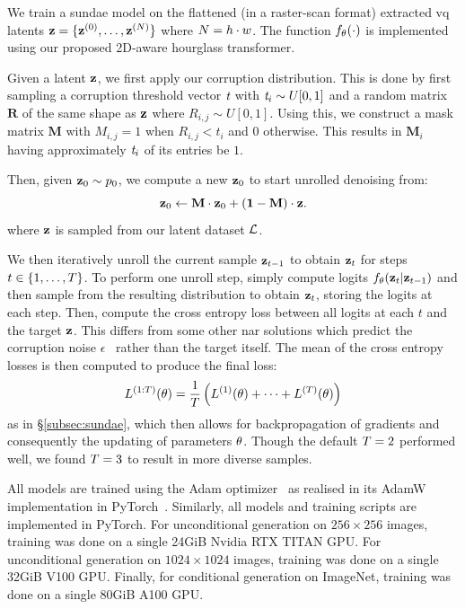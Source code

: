 We train a \gls{sundae} model on the flattened (in a raster-scan format)
extracted \gls{vq} latents $\mathbf{z} = \{\mathbf{z}^{(0)}, \dots, \mathbf{z}^{(N)}\}$
where $N = h \cdot w$. The function $f_\theta(\cdot)$ is
implemented using our proposed 2D-aware hourglass transformer. 

Given a latent $\mathbf{z}$, we first apply our corruption distribution. This is
done by first sampling a corruption threshold vector $\textit{t}$ with
$\textit{t}_i \sim U[0, 1]$ and a random matrix $\mathbf{R}$ of the
same shape as $\mathbf{z}$ where $R_{i,j} \sim U[0,1]$. Using this, we construct a
mask matrix $\mathbf{M}$ with $M_{i,j} = 1$ when $R_{i,j} < t_i$ and $0$
otherwise. This results in $\mathbf{M}_i$ having approximately
$\textit{t}_i$ of its entries be $1$.

Then, given $\mathbf{z}_0 \sim p_0$, we compute a new $\mathbf{z}_0$ to start unrolled
denoising from:
\begin{equation}
    \mathbf{z}_0 \leftarrow \mathbf{M} \cdot \mathbf{z}_0 + (\mathbf{1} - \mathbf{M})
    \cdot \mathbf{z} \text{.}
\end{equation}
where $\mathbf{z}$ is sampled from our latent dataset $\mathcal{L}$.

We then iteratively unroll the current sample $\mathbf{z}_{t-1}$ to obtain
$\mathbf{z}_t$ for steps $t\in \{1, \dots, T\}$. To perform one unroll
step, simply compute logits $f_\theta(\mathbf{z}_t \vert \mathbf{z}_{t-1})$ and then
sample from the resulting distribution to obtain $\mathbf{z}_t$, storing the logits
at each step. Then, compute the cross entropy loss between all logits at each
$t$ and the target $\mathbf{z}$. This differs from some other \gls{nar} solutions
which predict the corruption noise $\epsilon$~\cite{ho2020ddpm} rather than the
target itself. The mean of the cross entropy losses is then computed to produce
the final loss: 
\begin{equation} 
    L^{(1:T)}(\theta) = \frac{1}{T} \left(L^{(1)}(\theta) +
    \dots + L^{(T)}(\theta) \right) 
\end{equation} 
as in \S\ref{subsec:sundae}, which then allows for backpropagation of gradients
and consequently the updating of parameters $\theta$. Though the
default $T = 2$ performed well, we found $T = 3$ to result
in more diverse samples.

All models are trained using the Adam optimizer~\cite{kingma2014adam} as
realised in its AdamW implementation in PyTorch~\cite{paszke2019pytorch}.
Similarly, all models and training scripts are implemented in PyTorch. For
unconditional generation on $256 \times 256$ images, training was done on a
single 24GiB Nvidia RTX TITAN GPU. For unconditional generation on $1024 \times
1024$ images, training was done on a single 32GiB V100 GPU. Finally, for
conditional generation on ImageNet, training was done on a single 80GiB A100
GPU.


